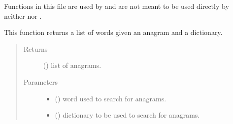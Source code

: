 \documentclass[letterpaper,10pt,english,openany,oneside]{sphinxmanual}
\begin{document}
Functions in this file are used by 
and are not meant to be used directly by neither
 nor .

\begin{fulllineitems}
\label{\detokenize{index:anagram.anagrams}}
This function returns a list of words given an anagram and a dictionary.
\begin{quote}\begin{description}
\item[{Returns}] \leavevmode
() list of anagrams.

\item[{Parameters}] \leavevmode\begin{itemize}
\item {} 
 () \textendash{} word used to search for anagrams.

\item {} 
 () \textendash{} dictionary to be used to search for anagrams.

\end{itemize}

\end{description}\end{quote}

\end{fulllineitems}

\end{document}
